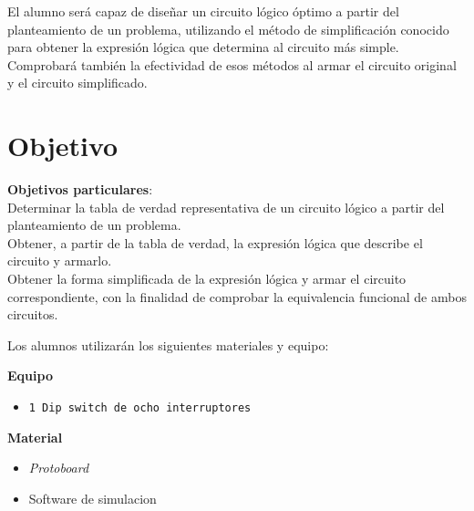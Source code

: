 \documentclass[a4paper,12pt]{article}
\begin{document}
\newpage

\tableofcontents

\newpage


El alumno será capaz de diseñar un circuito lógico óptimo a partir del planteamiento de un problema,
utilizando el método de simplificación conocido para obtener la expresión lógica que determina al
circuito más simple. Comprobará también la efectividad de esos métodos al armar el circuito original y
el circuito simplificado.\par

\section*{Objetivo}

\textbf{Objetivos particulares}: \\Determinar la tabla de verdad representativa de un circuito lógico a partir del planteamiento de un problema.\\
Obtener, a partir de la tabla de verdad, la expresión lógica que describe el circuito y armarlo. \\
Obtener la forma simplificada de la expresión lógica y armar el circuito correspondiente, con la finalidad
de comprobar la equivalencia funcional de ambos circuitos.\par

\vspace{.5cm}

Los alumnos utilizarán los siguientes materiales y equipo:

\begin{multicols}{2}
\textbf{Equipo}\\
\begin{itemize}[nosep]
		\item \texttt{1 Dip switch de ocho interruptores}
\end{itemize}

\columnbreak

\textbf{Material}\\
\begin{itemize}[nosep]
		\item \textit{Protoboard}
		\item Software de simulacion
	
\end{itemize}

\end{multicols}


%
%
%
%
\end{document}
